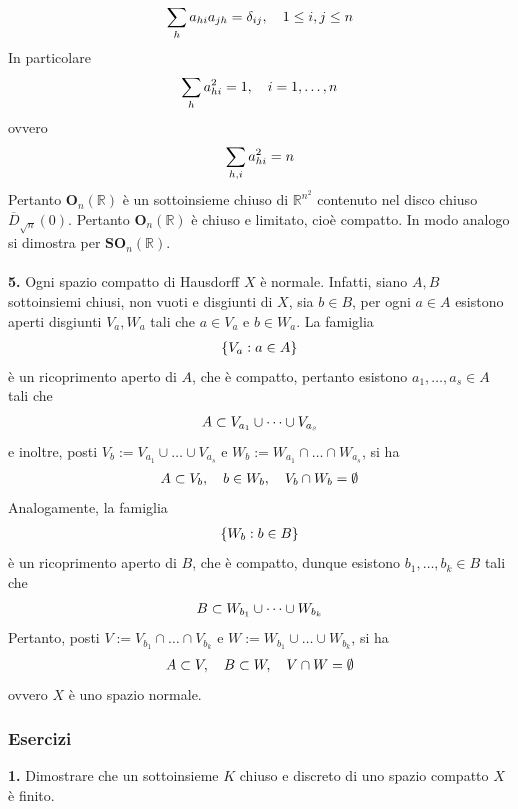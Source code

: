 \documentclass{article}
\begin{document}
\begin{gather}
    \sum_h a_{hi}a_{jh} = \delta_{ij}, \quad 1 \leq i, j \leq n \notag
\end{gather}
In particolare
\begin{gather}
    \sum_h a^2_{hi} = 1, \quad i = 1, \dots, n \notag
\end{gather}
ovvero
\begin{gather}
    \sum_{h, i} a^2_{hi} = n \notag
\end{gather}
Pertanto $\mathbf{O}_n(\mathbb{R})$ è un sottoinsieme chiuso di $\mathbb{R}^{n^2}$ contenuto nel disco chiuso $\overline{D}_{\sqrt{n}}(0)$. Pertanto $\mathbf{O}_n(\mathbb{R})$ è chiuso e limitato, cioè compatto. In modo analogo si dimostra per $\mathbf{SO}_n(\mathbb{R})$. \\ \\
\textbf{5.} Ogni spazio compatto di Hausdorff $X$ è normale. Infatti, siano $A, B$ sottoinsiemi chiusi, non vuoti e disgiunti di $X$, sia $b \in B$, per ogni $a \in A$ esistono aperti disgiunti $V_a, W_a$ tali che $a \in V_a$ e $b \in W_a$. La famiglia
\begin{gather}
    \{ V_a : a \in A \} \notag
\end{gather}
è un ricoprimento aperto di $A$, che è compatto, pertanto esistono $a_1, \dots, a_s \in A$ tali che
\begin{gather}
    A \subset V_{a_1} \cup \dots \cup V_{a_s} \notag
\end{gather}
e inoltre, posti $V_b := V_{a_1} \cup \dots \cup V_{a_s}$ e $W_b := W_{a_1} \cap \dots \cap W_{a_s}$, si ha
\begin{gather}
    A \subset V_b, \quad b \in W_b, \quad V_b \cap W_b = \emptyset \notag
\end{gather}
Analogamente, la famiglia
\begin{gather}
    \{ W_b : b \in B \} \notag
\end{gather}
è un ricoprimento aperto di $B$, che è compatto, dunque esistono $b_1, \dots, b_k \in B$ tali che
\begin{gather}
    B \subset W_{b_1} \cup \dots \cup W_{b_k} \notag
\end{gather}
Pertanto, posti $V := V_{b_1} \cap \dots \cap V_{b_k}$ e $W := W_{b_1} \cup \dots \cup W_{b_k}$, si ha
\begin{gather}
    A \subset V, \quad B \subset W, \quad V \cap W = \emptyset \notag
\end{gather}
ovvero $X$ è uno spazio normale.
\subsubsection{Esercizi}
\textbf{1.} Dimostrare che un sottoinsieme $K$ chiuso e discreto di uno spazio compatto $X$ è finito. \\
\end{document}
